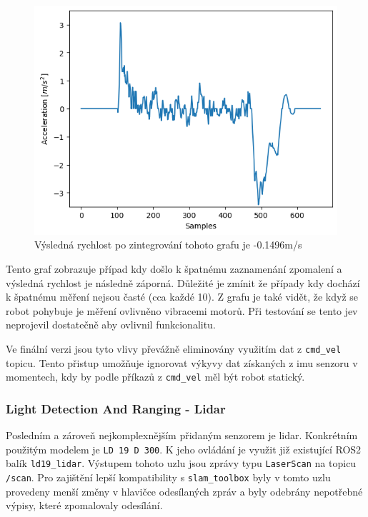 \begin{figure}[h!]
	\centering
	\includegraphics[scale=0.75]{obrazky-figures/accelerometer_graph.png}
	\caption{Výsledná rychlost po zintegrování tohoto grafu je -0.1496m/s}
	\label{}
\end{figure}
Tento graf zobrazuje případ kdy došlo k špatnému zaznamenání zpomalení a výsledná rychlost je následně záporná. Důležité je zmínit že případy kdy dochází k špatnému měření nejsou časté (cca každé 10). Z grafu je také vidět, že když se robot pohybuje je měření ovlivněno vibracemi motorů. Při testování se tento jev neprojevil dostatečně aby ovlivnil funkcionalitu.

Ve finální verzi jsou tyto vlivy převážně eliminovány využitím dat z \verb|cmd_vel| topicu. Tento přistup umožňuje ignorovat výkyvy dat získaných z imu senzoru v momentech, kdy by podle příkazů z \verb|cmd_vel| měl být robot statický.

\subsubsection*{Light Detection And Ranging - Lidar}
Posledním a zároveň nejkomplexnějším přidaným senzorem je lidar. Konkrétním použitým modelem je \verb|LD 19 D 300|. K jeho ovládání je využit již existující ROS2 balík \verb|ld19_lidar|. Výstupem tohoto uzlu jsou zprávy typu \verb|LaserScan| na topicu \verb|/scan|. Pro zajištění lepší kompatibility s \verb|slam_toolbox| byly v tomto uzlu provedeny menší změny v hlavičce odesílaných zpráv a byly odebrány nepotřebné výpisy, které zpomalovaly odesílání.

